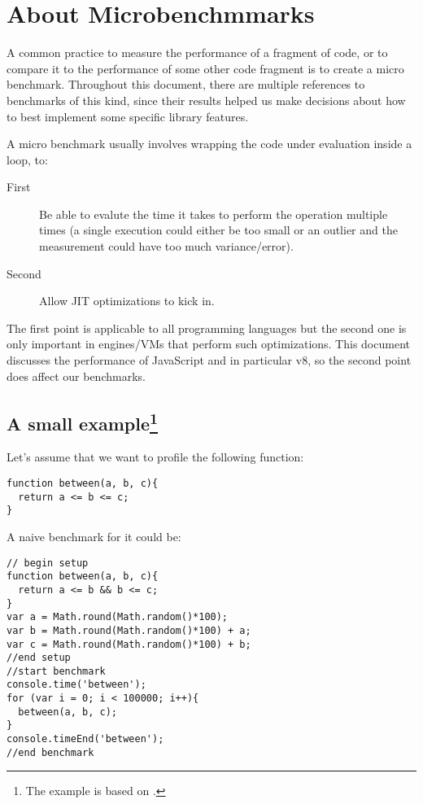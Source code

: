 \section{About Microbenchmmarks}
A common practice to measure the performance of a fragment of code, or to compare it to the performance of some other code fragment is to create a micro benchmark. Throughout this document, there are multiple references to benchmarks of this kind, since their results helped us make decisions about how to best implement some specific library features.

A micro benchmark usually involves wrapping the code under evaluation inside a loop, to:

\begin{description}
\item[First] Be able to evalute the time it takes to perform the operation multiple times (a single execution could either be too small or an outlier and the measurement could have too much variance/error).
\item[Second] Allow JIT optimizations to kick in.
\end{description}

The first point is applicable to all programming languages but the second one is only important in engines/VMs that perform such optimizations. This document discusses the performance of JavaScript and in particular v8, so the second point does affect our benchmarks.

\subsection{A small example\protect\footnote{The example is based on \cite{mraleph-bc}.}}
Let's assume that we want to profile the following function:
\begin{lstlisting}[caption=Function to benchmark]
function between(a, b, c){
  return a <= b <= c;
}
\end{lstlisting}

A naive benchmark for it could be:
\begin{lstlisting}[caption=Naive benchmark]
// begin setup
function between(a, b, c){
  return a <= b && b <= c;
}
var a = Math.round(Math.random()*100);
var b = Math.round(Math.random()*100) + a;
var c = Math.round(Math.random()*100) + b;
//end setup
//start benchmark
console.time('between');
for (var i = 0; i < 100000; i++){
  between(a, b, c);
}
console.timeEnd('between');
//end benchmark
\end{lstlisting}

